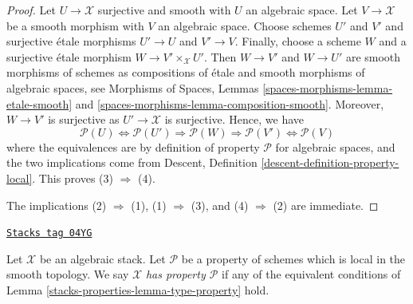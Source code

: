 \begin{proof}
Let $U \to \mathcal{X}$ surjective and smooth with $U$ an algebraic space.
Let $V \to \mathcal{X}$ be a smooth morphism with $V$ an algebraic space.
Choose schemes $U'$ and $V'$ and surjective \'etale morphisms
$U' \to U$ and $V' \to V$. Finally, choose a scheme $W$ and a
surjective \'etale morphism $W \to V' \times_\mathcal{X} U'$.
Then $W \to V'$ and $W \to U'$ are smooth morphisms of schemes
as compositions of \'etale and smooth morphisms of algebraic spaces, see
Morphisms of Spaces, Lemmas \ref{spaces-morphisms-lemma-etale-smooth} and
\ref{spaces-morphisms-lemma-composition-smooth}.
Moreover, $W \to V'$ is surjective as $U' \to \mathcal{X}$ is surjective.
Hence, we have
$$
\mathcal{P}(U) \Leftrightarrow
\mathcal{P}(U') \Rightarrow
\mathcal{P}(W) \Rightarrow
\mathcal{P}(V') \Leftrightarrow \mathcal{P}(V)
$$
where the equivalences are by definition of property $\mathcal{P}$ for
algebraic spaces, and the two implications come from
Descent, Definition \ref{descent-definition-property-local}.
This proves (3) $\Rightarrow$ (4).

\medskip\noindent
The implications (2) $\Rightarrow$ (1), (1) $\Rightarrow$ (3),
and (4) $\Rightarrow$ (2) are immediate.
\end{proof}

\begin{definition}
\label{stacks-properties-definition-type-property}
\href{https://stacks.math.columbia.edu/tag/04YG}{\texttt{Stacks tag 04YG}}

Let $\mathcal{X}$ be an algebraic stack.
Let $\mathcal{P}$ be a property of schemes which is
local in the smooth topology.
We say $\mathcal{X}$ {\it has property $\mathcal{P}$}
if any of the equivalent conditions of
Lemma \ref{stacks-properties-lemma-type-property}
hold.
\end{definition}

